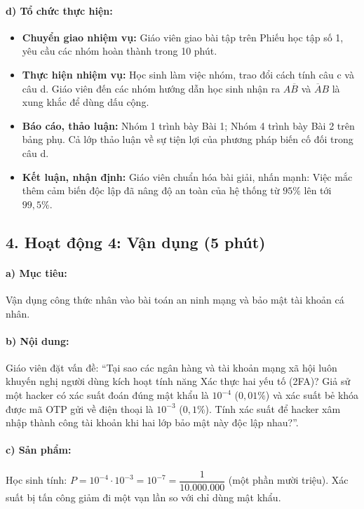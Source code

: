 \documentclass[12pt, a4paper]{article}
\begin{document}
\paragraph{d) Tổ chức thực hiện:}
\begin{itemize}[leftmargin=0.8cm]
    \item \textbf{Chuyển giao nhiệm vụ:} Giáo viên giao bài tập trên Phiếu học tập số 1, yêu cầu các nhóm hoàn thành trong 10 phút.
    \item \textbf{Thực hiện nhiệm vụ:} Học sinh làm việc nhóm, trao đổi cách tính câu c và câu d. Giáo viên đến các nhóm hướng dẫn học sinh nhận ra $A\overline{B}$ và $\overline{A}B$ là xung khắc để dùng dấu cộng.
    \item \textbf{Báo cáo, thảo luận:} Nhóm 1 trình bày Bài 1; Nhóm 4 trình bày Bài 2 trên bảng phụ. Cả lớp thảo luận về sự tiện lợi của phương pháp biến cố đối trong câu d.
    \item \textbf{Kết luận, nhận định:} Giáo viên chuẩn hóa bài giải, nhấn mạnh: Việc mắc thêm cảm biến độc lập đã nâng độ an toàn của hệ thống từ $95\%$ lên tới $99{,}5\%$.
\end{itemize}

\subsection*{4. Hoạt động 4: Vận dụng (5 phút)}

\paragraph{a) Mục tiêu:} Vận dụng công thức nhân vào bài toán an ninh mạng và bảo mật tài khoản cá nhân.

\paragraph{b) Nội dung:} Giáo viên đặt vấn đề: ``Tại sao các ngân hàng và tài khoản mạng xã hội luôn khuyến nghị người dùng kích hoạt tính năng Xác thực hai yếu tố (2FA)? Giả sử một hacker có xác suất đoán đúng mật khẩu là $10^{-4}$ ($0{,}01\%$) và xác suất bẻ khóa được mã OTP gửi về điện thoại là $10^{-3}$ ($0{,}1\%$). Tính xác suất để hacker xâm nhập thành công tài khoản khi hai lớp bảo mật này độc lập nhau?''.

\paragraph{c) Sản phẩm:} Học sinh tính: $P = 10^{-4} \cdot 10^{-3} = 10^{-7} = \dfrac{1}{10.000.000}$ (một phần mười triệu). Xác suất bị tấn công giảm đi một vạn lần so với chỉ dùng mật khẩu.
\end{document}
